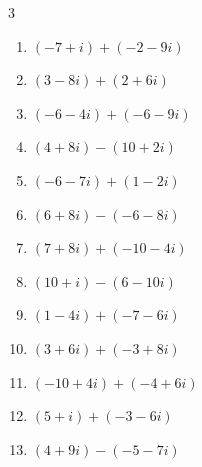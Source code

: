 \begin{multicols}{3}
\begin{enumerate}
  \item $\displaystyle (-7+i) + (-2-9i)$

        \phantom{$\displaystyle =-9-8i$}

  \item $\displaystyle (3-8i) + (2+6i)$

        \phantom{$\displaystyle =5-2i$}

  \item $\displaystyle (-6-4i) + (-6-9i)$

        \phantom{$\displaystyle =-12-13i$}

  \item $\displaystyle (4+8i) - (10+2i)$

        \phantom{$\displaystyle =-6+6i$}

  \item $\displaystyle (-6-7i) + (1-2i)$

        \phantom{$\displaystyle =-5-9i$}

  \item $\displaystyle (6+8i) - (-6-8i)$

        \phantom{$\displaystyle =12+16i$}

  \item $\displaystyle (7+8i) + (-10-4i)$

        \phantom{$\displaystyle =-3+4i$}

  \item $\displaystyle (10+i) - (6-10i)$

        \phantom{$\displaystyle =4+11i$}

  \item $\displaystyle (1-4i) + (-7-6i)$

        \phantom{$\displaystyle =-6-10i$}

  \item $\displaystyle (3+6i) + (-3+8i)$

        \phantom{$\displaystyle =14i$}

  \item $\displaystyle (-10+4i) + (-4+6i)$

        \phantom{$\displaystyle =-14+10i$}

  \item $\displaystyle (5+i) + (-3-6i)$

        \phantom{$\displaystyle =2-5i$}

  \item $\displaystyle (4+9i) - (-5-7i)$

        \phantom{$\displaystyle =9+16i$}


\end{enumerate}
\end{multicols}
